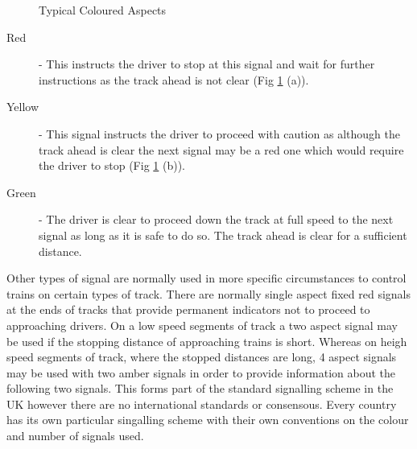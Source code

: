 \begin{figure}[h!]
\begin{center}
 \quad
{} \quad
{}

\end{center}
\caption{Typical Coloured Aspects}
\label{fig:aspects}
\end{figure}


\begin{description}

\item[Red] -  This instructs the driver to stop at this signal and wait for further instructions as the track ahead is not clear  (Fig \ref{fig:aspects} (a)). 


\item[Yellow] - This signal instructs the driver to proceed with caution as although the track ahead is clear the next signal may be a red one which would require the driver to stop (Fig \ref{fig:aspects} (b)).

\item[Green] -  The driver is clear to proceed down the track at full speed to the next signal as long as it is safe to do so. The track ahead is clear for a sufficient distance.
\end{description}

Other types of signal are normally used in more specific circumstances to control trains on certain types of track.  There are normally single aspect fixed red signals at the ends of tracks that provide permanent indicators not to proceed to approaching drivers. On a low speed segments of track a two aspect signal may be used if the stopping distance of approaching trains is short. Whereas on heigh speed segments of track, where the stopped distances are long, 4 aspect signals may be used with two amber signals in order to provide information about the following two signals. This forms part of the standard signalling scheme in the UK however there are no international standards or consensous. Every country has its own particular singalling scheme with their own conventions on the colour and number of signals used. 

